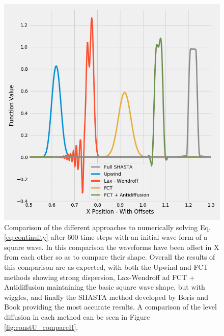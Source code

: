 \documentclass[]{article}
\begin{document}
\begin{figure}
	\centering
	\includegraphics[width=.8\linewidth]{figures/constU_fCompare_offset.png}
	\caption{Comparison of the different approaches to numerically solving Eq. \ref{eq:continuity} after 600 time steps with an initial wave form of a square wave. In this comparison the waveforms have been offset in X from each other so as to compare their shape. Overall the results of this comparison are as expected, with both the Upwind and FCT methods showing strong dispersion, Lax-Wendroff ad FCT + Antidiffusion maintaining the basic square wave shape, but with wiggles, and finally the SHASTA method developed by Boris and Book providing the most accurate results. A comparison of the level diffusion in each method can be seen in Figure \ref{fig:constU_compareH}. }
	\label{fig:constU_f_compare_offset}
\end{figure}
\end{document}
